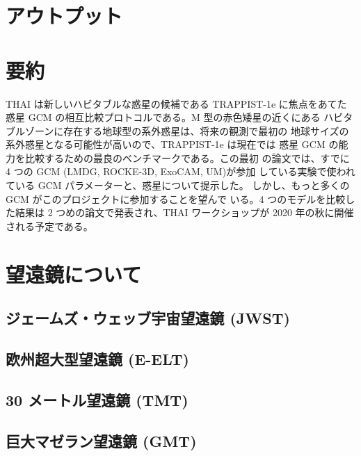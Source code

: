 \documentclass{dennou777}
\begin{document}
\section{アウトプット}\label{outputs}

\section{要約}\label{summary}
THAI は新しいハビタブルな惑星の候補である TRAPPIST-1e に焦点をあてた
惑星 GCM の相互比較プロトコルである。M 型の赤色矮星の近くにある
ハビタブルゾーンに存在する地球型の系外惑星は、将来の観測で最初の
地球サイズの系外惑星となる可能性が高いので、TRAPPIST-1e は現在では
惑星 GCM の能力を比較するための最良のベンチマークである。この最初
の論文では、すでに 4 つの GCM (LMDG, ROCKE-3D, ExoCAM, UM)が参加
している実験で使われている GCM パラメーターと、惑星について提示した。
しかし、もっと多くの GCM がこのプロジェクトに参加することを望んで
いる。4 つのモデルを比較した結果は 2 つめの論文で発表され、THAI
ワークショップが 2020 年の秋に開催される予定である。

\appendix
{}
\section{望遠鏡について\label{telescope}}
\subsection{ジェームズ・ウェッブ宇宙望遠鏡 (JWST)}
\subsection{欧州超大型望遠鏡 (E-ELT)}
\subsection{30 メートル望遠鏡 (TMT)}
\subsection{巨大マゼラン望遠鏡 (GMT)}
\end{document}
